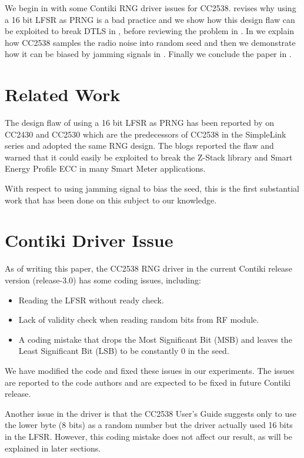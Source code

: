 We begin in  with some Contiki RNG driver issues for CC2538.  revises why using a 16 bit LFSR as PRNG is a bad practice and we show how this design flaw can be exploited to break DTLS in , before reviewing the problem in . In  we explain how CC2538 samples the radio noise into random seed and then we demonstrate how it can be biased by jamming signals in . Finally we conclude the paper in .

\section{Related Work}
The design flaw of using a 16 bit LFSR as PRNG has been reported by \cite{SmartMeterBlog}\cite{CC2530PRNG} on CC2430\cite{CC2430Manual} and CC2530\cite{CC2530Manual} which are the predecessors of CC2538 in the SimpleLink\cite{SimpleLink} series and adopted the same RNG design. The blogs reported the flaw and warned that it could easily be exploited to break the Z-Stack library\cite{ZStack} and Smart Energy Profile ECC in many Smart Meter applications.

With respect to using jamming signal to bias the seed, this is the first substantial work that has been done on this subject to our knowledge. 

\section{Contiki Driver Issue}\label{ContikiDriverIssue}
As of writing this paper,  the CC2538 RNG driver in the current Contiki release version (release-3.0) has some coding issues, including:
\begin{itemize}
	\item Reading the LFSR without ready check.
	\item Lack of validity check when reading random bits from RF module.
	\item A coding mistake that drops the Most Significant Bit (MSB) and leaves the Least Significant Bit (LSB) to be constantly $0$ in the seed.
\end{itemize}

We have modified the code and fixed these issues in our experiments. The issues are reported to the code authors and are expected to be fixed in future Contiki release.

Another issue in the driver is that the CC2538 User's Guide\cite{CC2538Manual} suggests only to use the lower byte (8 bits) as a random number but the driver actually used 16 bits in the LFSR. However, this coding mistake does not affect our result, as will be explained in  later sections.